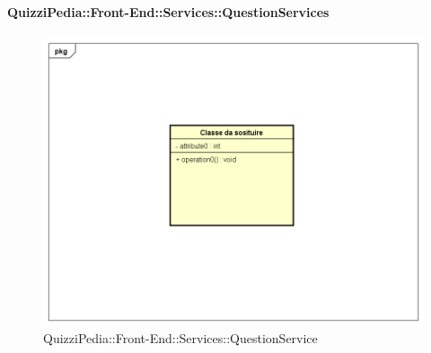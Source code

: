 \paragraph{QuizziPedia::Front-End::Services::QuestionServices}
\begin{figure}
	\centering
	\includegraphics[scale=0.45]{UML/Classi/Front-End/Temporanea.png}
	\caption{QuizziPedia::Front-End::Services::QuestionService}
\end{figure}
